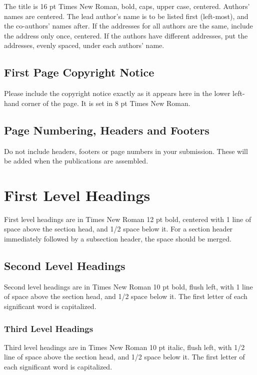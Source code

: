 \documentclass{article}
\begin{document}
The title is 16 pt Times New Roman, bold, caps, upper case, centered. Authors’ names are centered. The lead author’s name is to be listed first (left-most), and the co-authors’ names after. If the addresses for all authors are the same, include the address only once, centered. If the authors have different addresses, put the addresses, evenly spaced, under each authors’ name.

\subsection{First Page Copyright Notice}

Please include the copyright notice exactly as it appears here in the lower left-hand corner of the page. It is set in 8 pt Times New Roman.

\subsection{Page Numbering, Headers and Footers}

Do not include headers, footers or page numbers in your submission. These will be added when the publications are assembled.

\section{First Level Headings}

First level headings are in Times New Roman 12 pt bold, centered with 1 line of space above the section head, and 1/2 space below it. For a section header immediately followed by a subsection header, the space should be merged.

\subsection{Second Level Headings}

Second level headings are in Times New Roman 10 pt bold, flush left, with 1 line of space above the section head, and 1/2 space below it. The first letter of each significant word is capitalized.

\subsubsection{Third Level Headings}

Third level headings are in Times New Roman 10 pt italic, flush left, with 1/2 line of space above the section head, and 1/2 space below it. The first letter of each significant word is capitalized.
\end{document}
